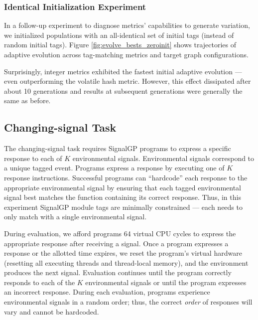 \subsubsection{Identical Initialization Experiment}



In a follow-up experiment to diagnose metrics' capabilities to generate variation, we initialized populations with an all-identical set of initial tags (instead of random initial tags).
Figure \ref{fig:evolve_bests_zeroinit} shows trajectories of adaptive evolution across tag-matching metrics and target graph configurations.

Surprisingly, integer metrics exhibited the fastest initial adaptive evolution --- even outperforming the volatile hash metric.
However, this effect dissipated after about 10 generations and results at subsequent generations were generally the same as before.

\subsection{Changing-signal Task} \label{sec:changing-signal}



The changing-signal task requires SignalGP programs to express a specific response to each of $K$ environmental signals.
Environmental signals correspond to a unique tagged event.
Programs express a response by executing one of $K$ response instructions.
Successful programs can ``hardcode'' each response to the appropriate environmental signal by ensuring that each tagged environmental signal best matches the function containing its correct response.
Thus, in this experiment SignalGP module tags are minimally constrained --- each needs to only match with a single environmental signal.

During evaluation, we afford programs 64 virtual CPU cycles to express the appropriate response after receiving a signal.
Once a program expresses a response or the allotted time expires, we reset the program's virtual hardware (resetting all executing threads and thread-local memory), and the environment produces the next signal.
Evaluation continues until the program correctly responds to each of the $K$ environmental signals or until the program expresses an incorrect response.
During each evaluation, programs experience environmental signals in a random order; thus, the correct \textit{order} of responses will vary and cannot be hardcoded.

